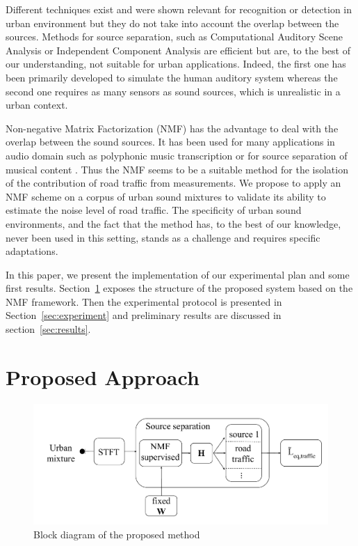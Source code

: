 \documentclass{article}
\begin{document}
\begin{sloppy}
Different techniques exist and were shown relevant for recognition or detection in urban environment \cite{Aucouturier} \cite{defreville} but they do not take into account the overlap between the sources. Methods for source separation, such as Computational Auditory Scene Analysis \cite{brown} or Independent Component Analysis \cite{comon} are efficient but are, to the best of our understanding, not suitable for urban applications. Indeed, the first one has been primarily developed to simulate the human auditory system whereas the second one requires as many sensors as sound sources, which is unrealistic in a urban context.

Non-negative Matrix Factorization (NMF) \cite{lee1999} has the advantage to deal with the overlap between the sound sources. It has been used for many applications in audio domain such as polyphonic music transcription \cite{smaragdis2003} or for source separation of musical content \cite{Virtanen2005}. Thus the NMF seems to be a suitable method for the isolation of the contribution of road traffic from measurements. We propose to apply an NMF scheme on a corpus of urban sound mixtures to validate its ability to estimate the noise level of road traffic. The specificity of urban sound environments, and the fact that the method has, to the best of our knowledge, never been used in this setting, stands as a challenge and requires specific adaptations.

In this paper, we present the implementation of our experimental plan and some first results. Section~\ref{sec:method} exposes the structure of the proposed system based on the NMF framework. Then the experimental protocol is presented in Section~\ref{sec:experiment} and preliminary results are discussed in section~\ref{sec:results}.


\section{Proposed Approach}\label{sec:method}

\begin{figure}[!ht]
\centering
\includegraphics[width=.7\textwidth]{images/bloc1.pdf}
\caption{Block diagram of the proposed method \label{block}}
\end{figure}


\end{sloppy}
\end{document}

